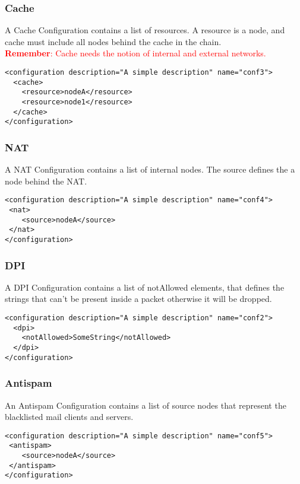 \documentclass[a4paper,11pt]{article}
\begin{document}
\subsubsection*{Cache}
A Cache Configuration contains a list of resources.
A resource is a node, and cache must include all nodes behind the cache in the chain.\\
\textcolor{red}{\textbf{Remember}: Cache needs the notion
of internal and external networks.}
\begin{lstlisting}[label={list:fifth},caption=Cache Configuration Example]
<configuration description="A simple description" name="conf3">
  <cache>
  	<resource>nodeA</resource>
  	<resource>node1</resource>
  </cache>
</configuration>
\end{lstlisting}
\subsubsection*{NAT}
A NAT Configuration contains a list of internal nodes.
The source defines the a node behind the NAT.
\begin{lstlisting}[label={list:sixth},caption=NAT Configuration Example]
<configuration description="A simple description" name="conf4">
 <nat>
  	<source>nodeA</source>
 </nat>
</configuration>
\end{lstlisting}
\subsubsection*{DPI}
A DPI Configuration contains a list of notAllowed elements, that defines the strings that can't be present inside a packet otherwise it will be dropped.
\begin{lstlisting}[label={list:seventh},caption=Cache Configuration Example]
<configuration description="A simple description" name="conf2">
  <dpi>
  	<notAllowed>SomeString</notAllowed>
  </dpi>
</configuration>
\end{lstlisting}
\subsubsection*{Antispam}
An Antispam Configuration contains a list of source nodes that represent the blacklisted mail clients and servers.
\begin{lstlisting}[label={list:eighth},caption=Antispam Configuration Example]
<configuration description="A simple description" name="conf5">
 <antispam>
  	<source>nodeA</source>
 </antispam>
</configuration>
\end{lstlisting}
\end{document}
